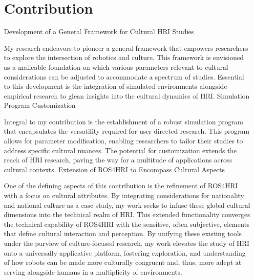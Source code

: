 
\chapter{Contribution}


Development of a General Framework for Cultural HRI Studies

My research endeavors to pioneer a general framework that empowers researchers to explore the intersection of robotics and culture. This framework is envisioned as a malleable foundation on which various parameters relevant to cultural considerations can be adjusted to accommodate a spectrum of studies. Essential to this development is the integration of simulated environments alongside empirical research to glean insights into the cultural dynamics of HRI.
Simulation Program Customization

Integral to my contribution is the establishment of a robust simulation program that encapsulates the versatility required for user-directed research. This program allows for parameter modification, enabling researchers to tailor their studies to address specific cultural nuances. The potential for customization extends the reach of HRI research, paving the way for a multitude of applications across cultural contexts.
Extension of ROS4HRI to Encompass Cultural Aspects

One of the defining aspects of this contribution is the refinement of ROS4HRI with a focus on cultural attributes. By integrating considerations for nationality and national culture as a case study, my work seeks to infuse these global cultural dimensions into the technical realm of HRI. This extended functionality converges the technical capability of ROS4HRI with the sensitive, often subjective, elements that define cultural interaction and perception.
By unifying these existing tools under the purview of culture-focused research, my work elevates the study of HRI onto a universally applicative platform, fostering exploration, and understanding of how robots can be made more culturally congruent and, thus, more adept at serving alongside humans in a multiplicity of environments.
